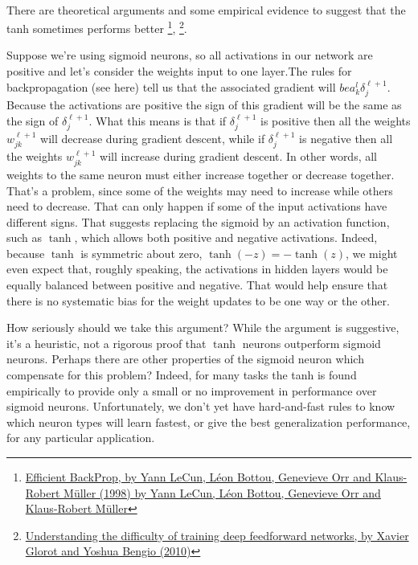  \paragraph{} There are theoretical arguments and some empirical evidence to suggest that the tanh sometimes performs better \footnote{\href{http://yann.lecun.com/exdb/publis/pdf/lecun-98b.pdf}{Efficient BackProp, by Yann LeCun, Léon Bottou, Genevieve Orr and Klaus-Robert Müller (1998) by Yann LeCun, Léon Bottou, Genevieve Orr and Klaus-Robert Müller}}, \footnote{\href{http://proceedings.mlr.press/v9/glorot10a/glorot10a.pdf}{Understanding the difficulty of training deep feedforward networks, by Xavier Glorot and Yoshua Bengio (2010)}}.
 
 Suppose we're using sigmoid neurons, so all activations in our network are positive and let's consider the weights input to one layer.The rules for backpropagation (see here) tell us that the associated gradient will $be a_k^l \delta^{\ell+1}_j$. Because the activations are positive the sign of this gradient will be the same as the sign of $\delta^{\ell+1}_j$. What this means is that if $\delta^{\ell+1}_j$ is positive then all the weights $w^{\ell+1}_{jk}$ will decrease during gradient descent, while if $\delta^{\ell+1}_j$ is negative then all the weights $w^{\ell+1}_{jk}$ will increase during gradient descent. In other words, all weights to the same neuron must either increase together or decrease together. That's a problem, since some of the weights may need to increase while others need to decrease. That can only happen if some of the input activations have different signs. That suggests replacing the sigmoid by an activation function, such as $\tanh$, which allows both positive and negative activations. Indeed, because $\tanh$ is symmetric about zero, $\tanh(-z)=-\tanh(z)$, we might even expect that, roughly speaking, the activations in hidden layers would be equally balanced between positive and negative. That would help ensure that there is no systematic bias for the weight updates to be one way or the other.

How seriously should we take this argument? While the argument is suggestive, it's a heuristic, not a rigorous proof that $\tanh$ neurons outperform sigmoid neurons. Perhaps there are other properties of the sigmoid neuron which compensate for this problem? Indeed, for many tasks the tanh is found empirically to provide only a small or no improvement in performance over sigmoid neurons. Unfortunately, we don't yet have hard-and-fast rules to know which neuron types will learn fastest, or give the best generalization performance, for any particular application.

